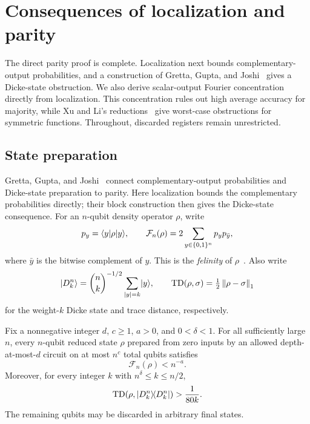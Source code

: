 \section{Consequences of localization and parity}
\label{sec:consequences}

The direct parity proof is complete. Localization next bounds
complementary-output probabilities, and a construction of Gretta, Gupta,
and Joshi~\cite{GGJ2026} gives a Dicke-state obstruction. We also derive
scalar-output Fourier concentration directly from localization.
This concentration rules out high average accuracy for majority,
while Xu and Li's reductions~\cite{XuLi2026Fanout} give worst-case
obstructions for symmetric functions. Throughout, discarded registers
remain unrestricted.

\subsection{State preparation}
\label{sec:state-preparation}

Gretta, Gupta, and Joshi~\cite{GGJ2026} connect complementary-output
probabilities and Dicke-state preparation to parity. Here localization
bounds the complementary probabilities directly; their block construction
then gives the Dicke-state consequence.
For an $n$-qubit density operator $\rho$, write
\[
 p_y=\langle y\rvert\rho\lvert y\rangle,\qquad
 \mathcal F_n(\rho)=2\sum_{y\in\{0,1\}^n}p_y p_{\bar y},
\]
where $\bar y$ is the bitwise complement of $y$.
This is the \emph{felinity} of $\rho$~\cite[Definition~2.1]{GGJ2026}.
Also write
\[
 \lvert D_k^n\rangle=\binom{n}{k}^{-1/2}\sum_{|y|=k}\lvert y\rangle,
 \qquad
 \operatorname{TD}(\rho,\sigma)=\tfrac12\left\lVert \rho-\sigma\right\rVert_1
\]
for the weight-$k$ Dicke state and trace distance, respectively.

\begin{corollary}
\label{cor:state-preparation}
Fix a nonnegative integer $d$, $c\ge1$, $a>0$, and $0<\delta<1$.
For all sufficiently large $n$, every $n$-qubit reduced state $\rho$
prepared from zero inputs by an allowed depth-at-most-$d$ circuit on
at most $n^c$ total qubits satisfies
\[
 \mathcal F_n(\rho)<n^{-a}.
\]
Moreover, for every integer $k$ with $n^\delta\le k\le n/2$,
\[
 \operatorname{TD}(\rho,\lvert D_k^n\rangle\!\langle D_k^n\rvert)>\frac1{80k}.
\]
The remaining qubits may be discarded in arbitrary final states.
\end{corollary}

